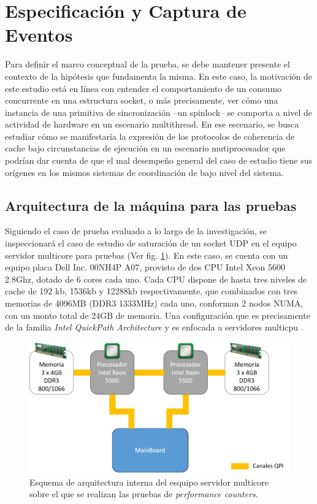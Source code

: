 \section{Especificación y Captura de Eventos}
Para definir el marco conceptual de la prueba, se debe mantener presente el contexto de la hipótesis que fundamenta la misma. En este caso, la motivación de este estudio está en línea con entender el comportamiento de un consumo concurrente en una estructura socket, o más precisamente, ver cómo una instancia de una primitiva de sincronización --un spinlock-- se comporta a nivel de actividad de hardware en un escenario multithread. En ese escenario, se busca estudiar cómo se manifestaría la expresión de los protocolos de coherencia de cache bajo circunstancias de ejecución en un escenario mutiprocesador que podrían dar cuenta de que el mal desempeño general del caso de estudio tiene sus orígenes en los mismos sistemas de coordinación de bajo nivel del sistema.

\subsection{Arquitectura de la máquina para las pruebas}
Siguiendo el caso de prueba evaluado a lo largo de la investigación, se inspeccionará el caso de estudio de saturación de un socket UDP en el equipo servidor multicore para pruebas (Ver fig. \ref{fig:hwspecs}). En este caso, se cuenta con un equipo placa Dell Inc. 00NH4P A07, provisto de dos CPU Intel Xeon 5600 2.8Ghz, dotado de 6 cores cada uno. Cada CPU dispone de hasta tres niveles de cache de 192 kb, 1536kb y 12288kb respectivamente, que combinados con tres memorias de 4096MB (DDR3 1333MHz) cada uno, conforman 2 nodos NUMA, con un monto total de 24GB de memoria. Una configuración que es precisamente de la familia \emph{Intel QuickPath Architecture} y es enfocada a servidores multicpu \cite{report:intelxeon5600, manual:intelxeon5600}.

\begin{figure}[!h]
	\centering
	\includegraphics[scale=.75]{imagenes/arch24Cores.png}
	\caption{Esquema de arquitectura interna del esquipo servidor multicore sobre el que se realizan las pruebas de \emph{performance counters}.}
	\label{fig:hwspecs}
\end{figure}

